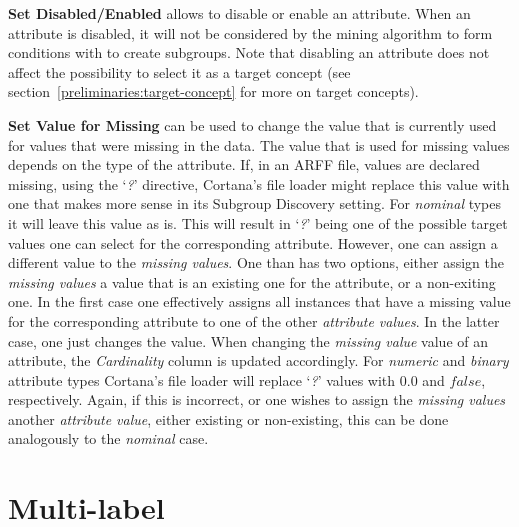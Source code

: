 \documentclass{article}
\begin{document}
\textbf{Set Disabled/Enabled} allows to disable or enable an attribute.
When an attribute is disabled, it will not be considered by the mining algorithm to form conditions with to create subgroups.
Note that disabling an attribute does not affect the possibility to select it as a target concept (see section~\ref{preliminaries:target-concept} for more on target concepts).

\textbf{Set Value for Missing} can be used to change the value that is currently used for values that were missing in the data.
The value that is used for missing values depends on the type of the attribute.
If, in an ARFF file, values are declared missing, using the `\emph{?}' directive, Cortana's file loader might replace this value with one that makes more sense in its Subgroup Discovery setting.
For \emph{nominal} types it will leave this value as is.
This will result in `\emph{?}' being one of the possible target values one can select for the corresponding attribute.
However, one can assign a different value to the \emph{missing values}.
One than has two options, either assign the \emph{missing values} a value that is an existing one for the attribute, or a non-exiting one.
In the first case one effectively assigns all instances that have a missing value for the corresponding attribute to one of the other \emph{attribute values}.
In the latter case, one just changes the value.
When changing the \emph{missing value} value of an attribute, the \emph{Cardinality} column is updated accordingly.
For \emph{numeric} and \emph{binary} attribute types Cortana's file loader will replace `\emph{?}' values with $0.0$ and $false$, respectively.
Again, if this is incorrect, or one wishes to assign the \emph{missing values} another \emph{attribute value}, either existing or non-existing, this can be done analogously to the \emph{nominal} case.





\section{Multi-label}
\label{section:multi-label}
\end{document}
